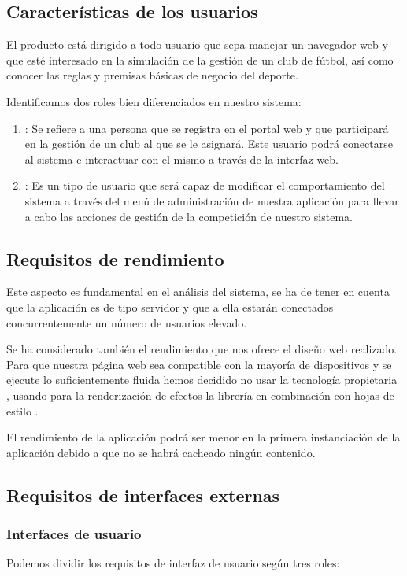 \subsection{Características de los usuarios}
El producto está dirigido a todo usuario que sepa manejar un navegador web y que
esté interesado en la simulación de la gestión de un club de fútbol, así como
conocer las reglas y premisas básicas de negocio del deporte.

Identificamos dos roles bien diferenciados en nuestro sistema:

\begin{enumerate}
\item {}: Se refiere a una persona que se registra en el
  portal web y que participará en la gestión de un club al que se le
  asignará. Este usuario podrá conectarse al sistema e interactuar con el mismo
  a través de la interfaz web.
\item {}: Es un tipo de usuario que será capaz de
  modificar el comportamiento del sistema a través del menú de administración de
  nuestra aplicación para llevar a cabo las acciones de gestión de la
  competición de nuestro sistema.
\end{enumerate}

\subsection{Requisitos de rendimiento}
Este aspecto es fundamental en el análisis del sistema, se ha de tener en cuenta
que la aplicación es de tipo servidor y que a ella estarán conectados
concurrentemente un número de usuarios elevado.

Se ha considerado también el rendimiento que nos ofrece el diseño web
realizado. Para que nuestra página web sea compatible con la mayoría de
dispositivos y se ejecute lo suficientemente fluida hemos decidido no usar la
tecnología propietaria , usando para la renderización de efectos
la librería  en combinación con hojas de estilo .

El rendimiento de la aplicación podrá ser menor en la primera instanciación de
la aplicación debido a que no se habrá cacheado ningún contenido.

\subsection{Requisitos de interfaces externas}
\subsubsection{Interfaces de usuario}
Podemos dividir los requisitos de interfaz de usuario según tres roles:

